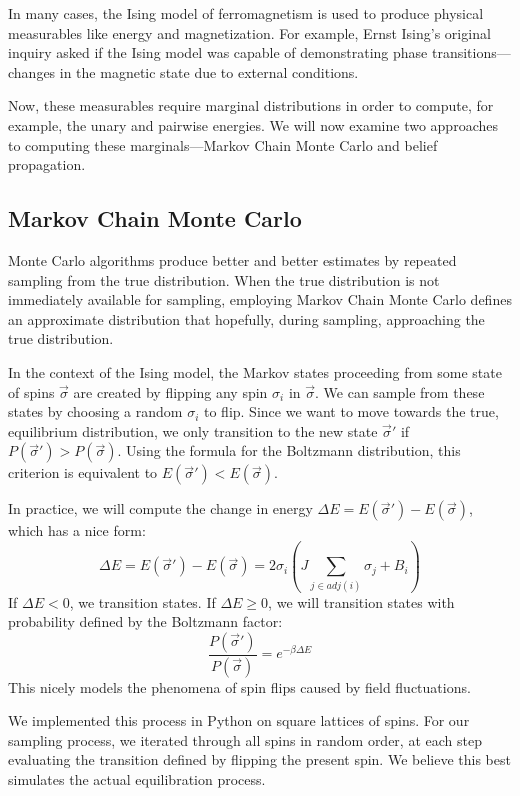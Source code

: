 \documentclass{article}
\begin{document}
In many cases, the Ising model of ferromagnetism is used to produce physical 
measurables like energy and magnetization. 
For example, Ernst Ising's original inquiry asked if the Ising model was capable 
of demonstrating phase transitions—changes in the magnetic state due to external 
conditions. 

Now, these measurables require marginal distributions in order to compute, for 
example, the unary and pairwise energies. 
We will now examine two approaches to computing these marginals—Markov Chain 
Monte Carlo and belief propagation. 





\subsection{Markov Chain Monte Carlo}





Monte Carlo algorithms produce better and better estimates by repeated sampling 
from the true distribution. 
When the true distribution is not immediately available for sampling, employing 
Markov Chain Monte Carlo defines an approximate distribution that hopefully, 
during sampling, approaching the true distribution. 

In the context of the Ising model, the Markov states proceeding from some state 
of spins $\vec{\sigma}$ are created by flipping any spin $\sigma_i$ in 
$\vec{\sigma}$. 
We can sample from these states by choosing a random $\sigma_i$ to flip. 
Since we want to move towards the true, equilibrium distribution, we only 
transition to the new state $\vec{\sigma}'$ if 
$P(\vec{\sigma}') > P(\vec{\sigma})$. 
Using the formula for the Boltzmann distribution, this criterion is equivalent 
to $E(\vec{\sigma}') < E(\vec{\sigma})$. 

In practice, we will compute the change in energy 
$\Delta E = E(\vec{\sigma}') - E(\vec{\sigma})$, which has a nice form:
\[
    \Delta E = E(\vec{\sigma}') - E(\vec{\sigma}) = 2 \sigma_i (J \sum_{j \in adj(i)} \sigma_j + B_i)
\]
If $\Delta E < 0$, we transition states. 
If $\Delta E \geq 0$, we will transition states with probability defined by the 
Boltzmann factor:
\[
    \frac{P(\vec{\sigma}')}{P(\vec{\sigma})}
    = e^{-\beta \Delta E} 
\]
This nicely models the phenomena of spin flips caused by field fluctuations. 

We implemented this process in Python on square lattices of spins. 
For our sampling process, we iterated through all spins in random order, at each 
step evaluating the transition defined by flipping the present spin. 
We believe this best simulates the actual equilibration process. 
\end{document}
